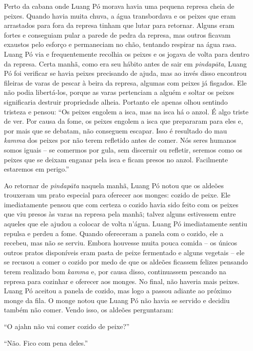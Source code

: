 Perto da cabana onde Luang Pó morava havia uma pequena represa cheia de
peixes. Quando havia muita chuva, a água transbordava e os peixes que
eram arrastados para fora da represa tinham que lutar para retornar.
Alguns eram fortes e conseguiam pular a parede de pedra da represa, mas
outros ficavam exaustos pelo esforço e permaneciam no chão, tentando
respirar na água rasa. Luang Pó via e frequentemente recolhia os peixes
e os jogava de volta para dentro da represa. Certa manhã, como era seu
hábito antes de sair em \emph{pindapāta}, Luang Pó foi verificar se
havia peixes precisando de ajuda, mas ao invés disso encontrou fileiras
de varas de pescar à beira da represa, algumas com peixes já fisgados.
Ele não podia libertá-los, porque as varas pertenciam a alguém e soltar
os peixes significaria destruir propriedade alheia. Portanto ele apenas
olhou sentindo tristeza e pensou: ``Os peixes engolem a isca, mas na
isca há o anzol. É algo triste de ver. Por causa da fome, os peixes
engolem a isca que prepararam para eles e, por mais que se debatam, não
conseguem escapar. Isso é resultado do mau \emph{kamma} dos peixes por
não terem refletido antes de comer. Nós seres humanos somos iguais -- se
comermos por gula, sem discernir ou refletir, seremos como os peixes que
se deixam enganar pela isca e ficam presos no anzol. Facilmente
estaremos em perigo.''

Ao retornar de \emph{pindapāta} naquela manhã, Luang Pó notou que os
aldeões trouxeram um prato especial para oferecer aos monges: cozido de
peixe. Ele imediatamente pensou que com certeza o cozido havia sido
feito com os peixes que viu presos às varas na represa pela manhã;
talvez alguns estivessem entre aqueles que ele ajudou a colocar de volta
n'água. Luang Pó imediatamente sentiu repulsa e perdeu a fome. Quando
ofereceram a panela com o cozido, ele a recebeu, mas não se serviu.
Embora houvesse muita pouca comida -- os únicos outros pratos
disponíveis eram pasta de peixe fermentado e alguns vegetais -- ele se
recusou a comer o cozido por medo de que os aldeões ficassem felizes
pensando terem realizado bom \emph{kamma} e, por causa disso,
continuassem pescando na represa para cozinhar e oferecer aos monges. No
final, não haveria mais peixes. Luang Pó aceitou a panela de cozido, mas
logo a passou adiante ao próximo monge da fila. O monge notou que Luang
Pó não havia se servido e decidiu também não comer. Vendo isso, os
aldeões perguntaram:

``O ajahn não vai comer cozido de peixe?''

``Não. Fico com pena deles.''

